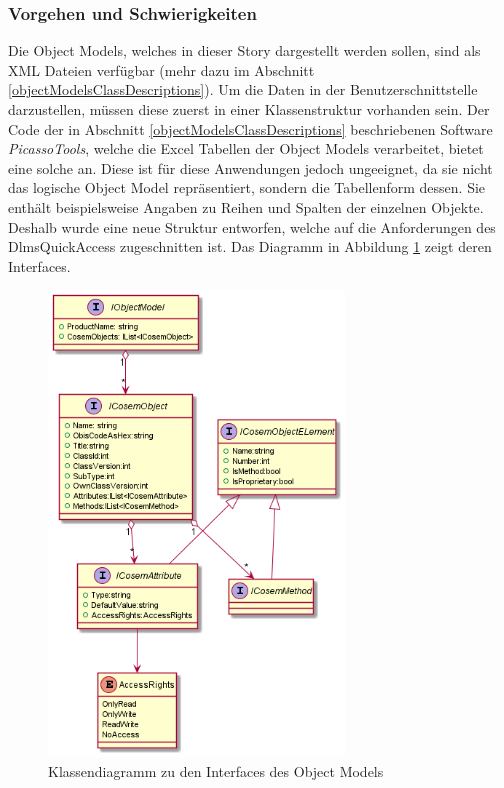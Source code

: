 \subsubsection{Vorgehen und Schwierigkeiten}\label{objectModelDevSchwierigkeiten}
Die Object Models, welches in dieser Story dargestellt werden sollen, sind als XML Dateien verfügbar (mehr dazu im Abschnitt \ref{objectModelsClassDescriptions}).
Um die Daten in der Benutzerschnittstelle darzustellen, müssen diese zuerst in einer Klassenstruktur vorhanden sein.
Der Code der in Abschnitt \ref{objectModelsClassDescriptions} beschriebenen Software \textit{PicassoTools}, welche die Excel Tabellen der Object Models verarbeitet, bietet eine solche an.
Diese ist für diese Anwendungen jedoch ungeeignet, da sie nicht das logische Object Model repräsentiert, sondern die Tabellenform dessen.
Sie enthält beispielsweise Angaben zu Reihen und Spalten der einzelnen Objekte.
Deshalb wurde eine neue Struktur entworfen, welche auf die Anforderungen des DlmsQuickAccess zugeschnitten ist.
Das Diagramm in Abbildung \ref{fig:objectModelInterface} zeigt deren Interfaces.

\begin{figure}
   \centering
   \includegraphics[width=0.7\textwidth]{gfx/ObjectModel_interfaces.png}
   \caption{
      Klassendiagramm zu den Interfaces des Object Models
      }
      \label{fig:objectModelInterface}
\end{figure}

